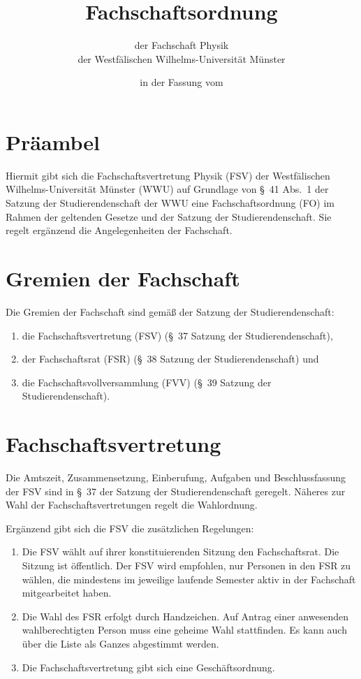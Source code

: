 \documentclass[
	a4paper,
	12pt,
	oneside,
	parskip=half-,
	pagesize,
	headsepline,
	german,
	ngerman
]{scrartcl}
\title{Fachschaftsordnung}
\subtitle{der Fachschaft Physik\\
der Westfälischen Wilhelms-Universität Münster}
\date{in der Fassung vom \formatdate{06}{01}{2016}}
\author{}
\begin{document}
\maketitle

\section{Präambel}
Hiermit gibt sich die Fachschaftsvertretung Physik (FSV) der Westfälischen Wilhelms-Universi\-tät Münster (WWU) auf Grundlage von §~41 Abs.~1 der Satzung der Studierendenschaft der WWU eine Fachschaftsordnung (FO) im Rahmen der geltenden Gesetze und der Satzung der Studierendenschaft. Sie regelt ergänzend die Angelegenheiten der Fachschaft.

\setcounter{section}{1}
\section{Gremien der Fachschaft}
Die Gremien der Fachschaft sind gemäß der Satzung der Studierendenschaft:
\begin{enumerate}
	\item die Fachschaftsvertretung (FSV) (§~37 Satzung der Studierendenschaft),
	\item der Fachschaftsrat (FSR) (§~38 Satzung der Studierendenschaft) und 
	\item die Fachschaftsvollversammlung (FVV) (§~39 Satzung der Studierendenschaft).
\end{enumerate}

\section{Fachschaftsvertretung}
Die Amtszeit, Zusammensetzung, Einberufung, Aufgaben und Beschlussfassung der FSV sind in §~37 der Satzung der Studierendenschaft geregelt. Näheres zur Wahl der Fachschaftsvertretungen regelt die Wahlordnung.

Ergänzend gibt sich die FSV die zusätzlichen Regelungen:
\begin{enumerate}
	\item Die FSV wählt auf ihrer konstituierenden Sitzung den Fachschaftsrat. Die Sitzung ist öffentlich. Der FSV wird empfohlen, nur Personen in den FSR zu wählen, die mindestens im jeweilige laufende Semester aktiv in der Fachschaft mitgearbeitet haben.
	\item Die Wahl des FSR erfolgt durch Handzeichen. Auf Antrag einer anwesenden wahlberechtigten Person muss eine geheime Wahl stattfinden. Es kann auch über die Liste als Ganzes abgestimmt werden.
	\item Die Fachschaftsvertretung gibt sich eine Geschäftsordnung.
\end{enumerate}
\end{document}
